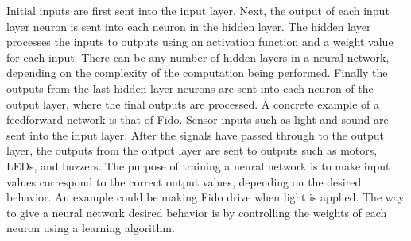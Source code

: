 Initial inputs are first sent into the input layer.  Next, the output of each input layer neuron is sent into each neuron in the hidden layer.  The hidden layer processes the inputs to outputs using an activation function and a weight value for each input.  There can be any number of hidden layers in a neural network, depending on the complexity of the computation being performed.  Finally the outputs from the last hidden layer neurons are sent into each neuron of the output layer, where the final outputs are processed.  A concrete example of a feedforward network is that of Fido.  Sensor inputs such as light and sound are sent into the input layer.  After the signals have passed through to the output layer, the outputs from the output layer are sent to outputs such as motors, LEDs, and buzzers.   The purpose of training a neural network is to make input values correspond to the correct output values, depending on the desired behavior.  An example could be making Fido drive when light is applied.  The way to give a neural network desired behavior is by controlling the weights of each neuron using a learning algorithm.